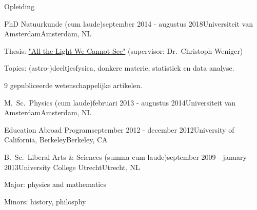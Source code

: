 \documentclass{resume} %
\begin{document}

\begin{rSection}{Opleiding}

\begin{rSubsection}{PhD Natuurkunde (cum laude)}{september 2014 - augustus 2018}{Universiteit van Amsterdam}{Amsterdam, NL}
\vspace{-1.5em}
\item Thesis: \href{https://pure.uva.nl/ws/files/28193639/Thesis.pdf}{"All the Light We Cannot See"} (supervisor: Dr.~Christoph Weniger)
\item Topics: (astro-)deeltjesfysica, donkere materie, statistiek en data analyse.
\item 9 gepubliceerde wetenschappelijke artikelen.
\end{rSubsection}

\begin{rSubsection}{M.~Sc.~Physics (cum laude)}{februari 2013 - augustus 2014}{Universiteit van Amsterdam}{Amsterdam, NL}
\vspace{-1.5em}
\end{rSubsection}

\begin{rSubsection}{Education Abroad Program}{september 2012 - december 2012}{University of California, Berkeley}{Berkeley, CA}
\vspace{-1.5em}
\end{rSubsection}

\begin{rSubsection}{B.~Sc.~Liberal Arts \& Sciences (summa cum laude)}{september 2009 - january 2013}{University College Utrecht}{Utrecht, NL}
\vspace{-1.5em}
 \item Major: physics and mathematics
 \item Minors: history, philosphy
\end{rSubsection}
\end{rSection}

\end{document}
